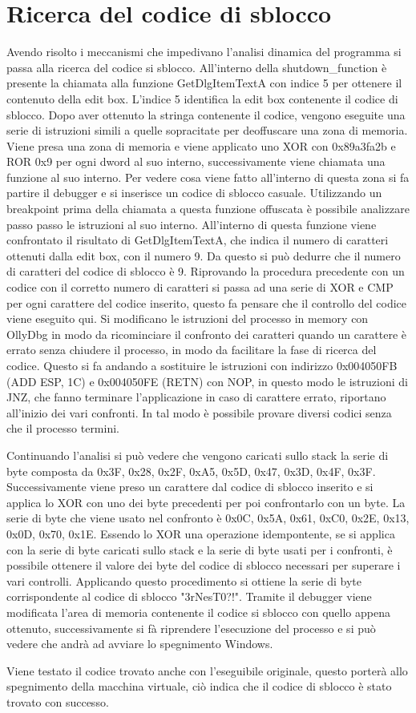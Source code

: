 \documentclass[a4paper,12pt]{article}
\begin{document}
\section{Ricerca del codice di sblocco}
Avendo risolto i meccanismi che impedivano l'analisi dinamica del programma si passa alla ricerca del codice si sblocco. All'interno della shutdown\_function è presente la chiamata alla funzione GetDlgItemTextA con indice 5 per ottenere il contenuto della edit box.  L'indice 5 identifica la edit box contenente il codice di sblocco. 
Dopo aver ottenuto la stringa  contenente il codice, vengono eseguite una serie di istruzioni simili a quelle sopracitate per deoffuscare una zona di memoria. Viene presa una zona di memoria e viene applicato uno XOR con 0x89a3fa2b e ROR 0x9 per ogni dword al suo interno, successivamente viene chiamata una funzione al suo interno. Per vedere cosa viene fatto all'interno di questa zona si fa partire il debugger e si inserisce un codice di sblocco casuale. Utilizzando un breakpoint prima della chiamata a questa funzione offuscata è possibile analizzare passo passo le istruzioni al suo interno. All'interno di questa funzione viene confrontato il risultato di GetDlgItemTextA, che indica il numero di caratteri ottenuti dalla edit box, con il numero 9. Da questo si può dedurre che il numero di caratteri del codice di sblocco è 9.
Riprovando la procedura precedente con un codice con il corretto numero di caratteri si passa ad una serie di XOR e CMP per ogni carattere del codice inserito, questo fa pensare che il controllo del codice viene eseguito qui. Si modificano le istruzioni del processo in memory con OllyDbg in modo da ricominciare il confronto dei caratteri quando un carattere è errato senza chiudere il processo, in modo da facilitare la fase di ricerca del codice.  Questo si fa andando a sostituire le istruzioni con indirizzo 0x004050FB (ADD ESP, 1C) e 0x004050FE (RETN) con NOP, in questo modo le istruzioni di JNZ, che fanno terminare l'applicazione in caso di carattere errato, riportano all'inizio dei vari confronti.
In tal modo è possibile provare diversi codici senza che il processo termini. 

Continuando l'analisi si può vedere che vengono caricati sullo stack la serie di byte composta da 0x3F, 0x28, 0x2F, 0xA5, 0x5D, 0x47, 0x3D, 0x4F, 0x3F. Successivamente viene preso un carattere dal codice di sblocco inserito e si applica lo XOR con uno dei byte precedenti per poi confrontarlo con un byte. La serie di byte che viene usato nel confronto è 0x0C, 0x5A, 0x61, 0xC0, 0x2E, 0x13, 0x0D, 0x70, 0x1E. Essendo lo XOR una operazione idempontente, se si applica con la serie di byte caricati sullo stack e la serie di byte usati per i confronti, è possibile ottenere il valore dei byte del codice di sblocco necessari per superare i vari controlli. Applicando questo procedimento si ottiene la serie di byte corrispondente al codice di sblocco "3rNesT0?!". Tramite il debugger viene modificata l'area di memoria contenente il codice si sblocco con quello appena ottenuto, successivamente si fà riprendere l'esecuzione del processo e si può vedere che andrà ad avviare lo spegnimento Windows.

Viene testato il codice trovato anche con l'eseguibile originale, questo porterà allo spegnimento della macchina virtuale, ciò indica che il codice di sblocco è stato trovato con successo. 
\end{document}
